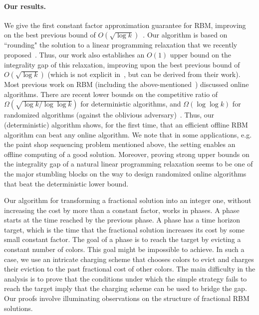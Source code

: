 \documentclass[11pt]{article}
\begin{document}
\paragraph{Our results.}
We give the first constant factor approximation guarantee for RBM,
improving on the best previous bound of $O(\sqrt{\log k})$~\cite{ACER11}.
Our algorithm is based on ``rounding" the solution to a linear programming
relaxation that we recently proposed~\cite{AR10}. Thus, our work also
establishes an $O(1)$ upper bound on the integrality gap of this
relaxation, improving upon the best previous bound of $O(\sqrt{\log k})$
(which is not explicit in~\cite{ACER11}, but can be derived from their work).
Most previous work on RBM (including the above-mentioned~\cite{AR10,ACER11})
discussed online algorithms. There are recent lower bounds on the competitive
ratio of $\Omega(\sqrt{\log k/\log\log k})$ for deterministic algorithms, and
$\Omega(\log\log k)$ for randomized algorithms
(against the oblivious adversary)~\cite{ACER11}. Thus, our (deterministic) algorithm
shows, for the first time, that an efficient offline RBM algorithm can beat any online
algorithm. We note that in some applications, e.g. the paint shop sequencing
problem mentioned above, the setting enables an offline computing of a
good solution. Moreover, proving strong upper bounds on the integrality
gap of a natural linear programming relaxation seems to be one of the major
stumbling blocks on the way to design randomized online algorithms that
beat the deterministic lower bound.

Our algorithm for transforming a fractional solution into an integer one, without
increasing the cost by more than a constant factor, works in phases. A phase
starts at the time reached by the previous phase. A phase has a time horizon
target, which is the time that the fractional solution increases its cost by some
small constant factor. The goal of a phase is to reach the target by evicting a
constant number of colors. This goal might be impossible to achieve. In such
a case, we use an intricate charging scheme that chooses colors to evict and
charges their eviction to the past fractional cost of other colors. The main
difficulty in the analysis is to prove that the conditions under which the simple
strategy fails to reach the target imply that the charging scheme can be used
to bridge the gap. Our proofs involve illuminating observations on the structure
of fractional RBM solutions.
\end{document}
